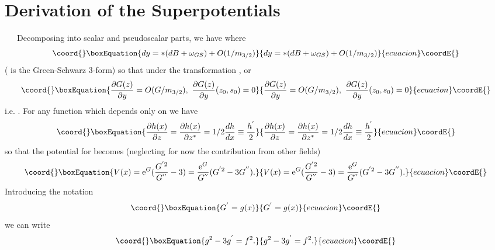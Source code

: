 \documentclass[a4paper,12pt]{article}
\begin{document}
\section{Derivation of the Superpotentials}
\ \ \  Decomposing \coordHE{} into scalar and pseudoscalar parts, we have
\coordHE{} where
 \begin{equation}\coord{}\boxEquation{\label{y}
    dy  = *(dB + \omega_{GS}) + O(1/m_{3/2})
}{dy  = *(dB + \omega_{GS}) + O(1/m_{3/2})
}{ecuacion}\coordE{}\end{equation}
(\coordHE{} is the Green-Schwarz 3-form) so that under the
transformation \coordHE{}, \coordHE{} or
\begin{equation}\coord{}\boxEquation{\label{z}
 \frac{\partial G(z)}{\partial y} = O(G/m_{3/2}),\  \frac{\partial G(z)}{\partial
 y}(z_{0},s_{0})=0
}{\frac{\partial G(z)}{\partial y} = O(G/m_{3/2}),\  \frac{\partial G(z)}{\partial
 y}(z_{0},s_{0})=0
}{ecuacion}\coordE{}\end{equation}
i.e. \coordHE{}. For any function \coordHE{} which
depends only on \coordHE{} we have
\begin{equation}\coord{}\boxEquation{\label{PD}
   \frac{\partial h(x)}{\partial z} = \frac{\partial h(x)}{\partial
   z^{*}} =  1/2 \frac{dh}{dx} \equiv \frac{h^{'}}{2}
}{\frac{\partial h(x)}{\partial z} = \frac{\partial h(x)}{\partial
   z^{*}} =  1/2 \frac{dh}{dx} \equiv \frac{h^{'}}{2}
}{ecuacion}\coordE{}\end{equation}
so that the potential for \coordHE{} becomes (neglecting for now the
contribution from other fields)
\begin{equation}\coord{}\boxEquation{\label{V1}
 V(x) = \mathrm{e}^{G}(\frac{G^{'2}}{G^{''}}-3) =
 \frac{\mathrm{e}^{G}}{G^{''}}(G^{'2}-3G^{''}).
}{V(x) = \mathrm{e}^{G}(\frac{G^{'2}}{G^{''}}-3) =
 \frac{\mathrm{e}^{G}}{G^{''}}(G^{'2}-3G^{''}).
}{ecuacion}\coordE{}\end{equation}
Introducing the notation
\begin{equation}\coord{}\boxEquation{\label{g}
    G^{'} = g(x)
}{G^{'} = g(x)
}{ecuacion}\coordE{}\end{equation}
we can write
\begin{equation}\coord{}\boxEquation{\label{f}
    g^{2} - 3g^{'} = f^{2}.
}{g^{2} - 3g^{'} = f^{2}.
}{ecuacion}\coordE{}\end{equation}
\end{document}
